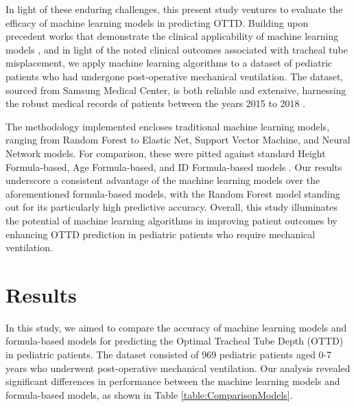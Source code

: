 \documentclass[11pt]{article}
\begin{document}
In light of these enduring challenges, this present study ventures to evaluate the efficacy of machine learning models in predicting OTTD. Building upon precedent works that demonstrate the clinical applicability of machine learning models \cite{Zhou2022PredictionOE}, and in light of the noted clinical outcomes associated with tracheal tube misplacement, we apply machine learning algorithms to a dataset of pediatric patients who had undergone post-operative mechanical ventilation. The dataset, sourced from Samsung Medical Center, is both reliable and extensive, harnessing the robust medical records of patients between the years 2015 to 2018 \cite{Flori2011PositiveFB}.

The methodology implemented encloses traditional machine learning models, ranging from Random Forest to Elastic Net, Support Vector Machine, and Neural Network models. For comparison, these were pitted against standard Height Formula-based, Age Formula-based, and ID Formula-based models \cite{Meng2016LithiumPB, Yac2022EducationalDM}. Our results underscore a consistent advantage of the machine learning models over the aforementioned formula-based models, with the Random Forest model standing out for its particularly high predictive accuracy. Overall, this study illuminates the potential of machine learning algorithms in improving patient outcomes by enhancing OTTD prediction in pediatric patients who require mechanical ventilation.

\section*{Results}

In this study, we aimed to compare the accuracy of machine learning models and formula-based models for predicting the Optimal Tracheal Tube Depth (OTTD) in pediatric patients. The dataset consisted of 969 pediatric patients aged 0-7 years who underwent post-operative mechanical ventilation. Our analysis revealed significant differences in performance between the machine learning models and formula-based models, as shown in Table \ref{table:ComparisonModels}. 
\end{document}
